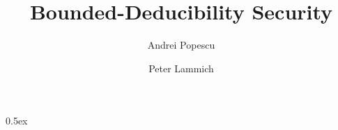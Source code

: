 \documentclass[11pt,a4paper]{article}
\begin{document}
\title{Bounded-Deducibility Security}
\author{Andrei Popescu \and Peter Lammich}
\date{}
\maketitle

\tableofcontents

\parindent 0pt\parskip 0.5ex





%
%
\end{document}
